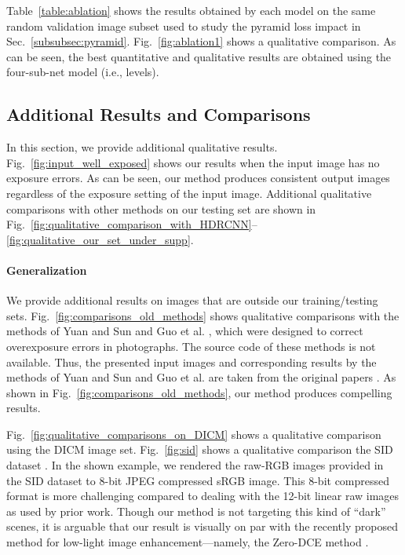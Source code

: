 \documentclass[final]{cvpr}
\begin{document}
Table\ \ref{table:ablation} shows the results obtained by each model on the same random validation image subset used to study the pyramid loss impact in Sec.\ \ref{subsubsec:pyramid}. Fig.\ \ref{fig:ablation1} shows a qualitative comparison. As can be seen, the best quantitative and qualitative results are obtained using the four-sub-net model  (i.e.,  levels). 




 
 
 
 



\subsection{Additional Results and Comparisons}\label{sec:additional_results}


In this section, we provide additional qualitative results. Fig.\ \ref{fig:input_well_exposed} shows our results when the input image has no exposure errors. As can be seen, our method produces consistent output images regardless of the exposure setting of the input image. Additional qualitative comparisons with other methods on our testing set are shown in Fig.\ \ref{fig:qualitative_comparison_with_HDRCNN}--\ref{fig:qualitative_our_set_under_supp}. 


\paragraph{Generalization}
We provide additional results on images that are outside our training/testing sets. Fig.\ \ref{fig:comparisons_old_methods} shows qualitative comparisons with the methods of Yuan and Sun \cite{yuan2012automatic} and Guo et al. \cite{guo2010correcting}, which were designed to correct overexposure errors in photographs.  The source code of these methods is not available. Thus, the presented input images and corresponding results by the methods of Yuan and Sun \cite{yuan2012automatic} and Guo et al. \cite{guo2010correcting} are taken from the original papers \cite{yuan2012automatic, guo2010correcting}. As shown in Fig.\ \ref{fig:comparisons_old_methods}, our method produces compelling results. 

Fig.\ \ref{fig:qualitative_comparisons_on_DICM} shows a qualitative comparison using the DICM image set. Fig.\ \ref{fig:sid} shows a qualitative comparison the SID dataset \cite{chen2018learning}. In the shown example, we rendered the raw-RGB images provided in the SID dataset to 8-bit JPEG compressed sRGB image. This 8-bit compressed format is more challenging compared to dealing with the 12-bit linear raw images as used by prior work. Though our method is not targeting this kind of ``dark'' scenes, it is arguable that our result is visually on par with the recently proposed method for low-light image enhancement---namely, the Zero-DCE method \cite{guo2020zero}. 
\end{document}
